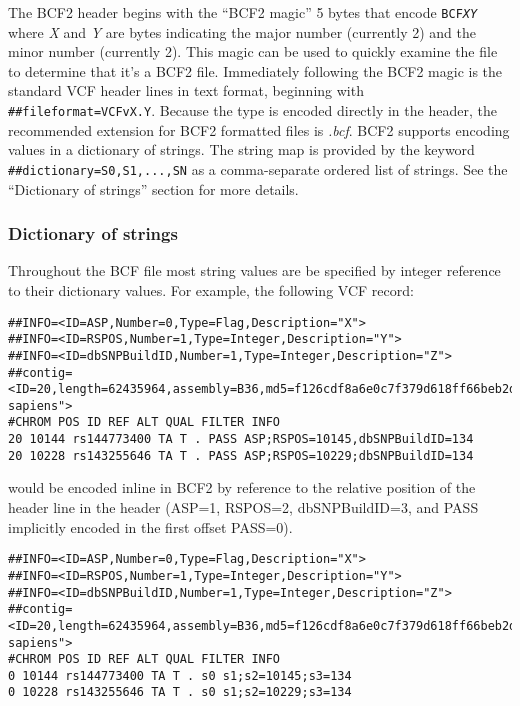 \documentclass[8pt]{article}
\begin{document}
The BCF2 header begins with the ``BCF2 magic'' 5 bytes that encode
{\tt BCF\em XY} where {\em X} and {\em Y} are bytes indicating the major
number (currently 2) and the minor number (currently 2).  This magic can be
used to quickly examine the file to determine that it's a BCF2 file.
Immediately following the BCF2 magic is the standard VCF header lines in text
format, beginning with \verb|##fileformat=VCFvX.Y|.  Because the type is
encoded directly in the header, the recommended extension for BCF2 formatted
files is {\sl .bcf}.  BCF2 supports encoding values in a dictionary of strings.
The string map is provided by the keyword \verb|##dictionary=S0,S1,...,SN| as a
comma-separate ordered list of strings.  See the ``Dictionary of strings''
section for more details.

\subsubsection{Dictionary of strings}

Throughout the BCF file most string values are be specified by integer
reference to their dictionary values.  For example, the following VCF record:
\small
\begin{verbatim}
##INFO=<ID=ASP,Number=0,Type=Flag,Description="X">
##INFO=<ID=RSPOS,Number=1,Type=Integer,Description="Y">
##INFO=<ID=dbSNPBuildID,Number=1,Type=Integer,Description="Z">
##contig=<ID=20,length=62435964,assembly=B36,md5=f126cdf8a6e0c7f379d618ff66beb2da,species="Homo sapiens">
#CHROM POS ID REF ALT QUAL FILTER INFO
20 10144 rs144773400 TA T . PASS ASP;RSPOS=10145,dbSNPBuildID=134
20 10228 rs143255646 TA T . PASS ASP;RSPOS=10229;dbSNPBuildID=134
\end{verbatim}
\normalsize
would be encoded inline in BCF2 by reference to the relative position of the header line in the header (ASP=1, RSPOS=2, dbSNPBuildID=3, and PASS implicitly encoded in the first offset PASS=0).

\small
\begin{verbatim}
##INFO=<ID=ASP,Number=0,Type=Flag,Description="X">
##INFO=<ID=RSPOS,Number=1,Type=Integer,Description="Y">
##INFO=<ID=dbSNPBuildID,Number=1,Type=Integer,Description="Z">
##contig=<ID=20,length=62435964,assembly=B36,md5=f126cdf8a6e0c7f379d618ff66beb2da,species="Homo sapiens">
#CHROM POS ID REF ALT QUAL FILTER INFO
0 10144 rs144773400 TA T . s0 s1;s2=10145;s3=134
0 10228 rs143255646 TA T . s0 s1;s2=10229;s3=134
\end{verbatim}
\normalsize
\end{document}
